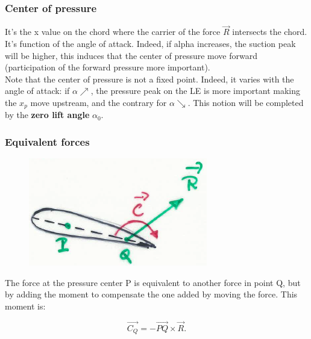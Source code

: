 				\subsubsection{Center of pressure}
					It's the x value on the chord where the carrier of the force $\vec{R}$ intersects the chord. It's function of the angle of attack. Indeed, if alpha increases, the suction peak will be higher, this induces that the center of pressure move forward (participation of the forward pressure more important).\\
					
					Note that the center of pressure is not a fixed point. Indeed, it varies with the angle of attack: if $\alpha \nearrow$, the pressure peak on the LE is more important making the $x_p$ move upstream, and the contrary for $\alpha \searrow$. This notion will be completed by the \textbf{zero lift angle} $\alpha _{0}$.
					
				\subsubsection{Equivalent forces}
					\begin{figure}
					\vspace{-5mm}
					\includegraphics[scale=0.4]{ch2/11}
					\end{figure}
					The force at the pressure center P is equivalent to another force in point Q, but by adding the moment to compensate the one added by moving the force. This moment is:
					
					\begin{equation}
					\vec{C_Q} = -\vec{PQ}\times \vec{R}.
					\end{equation}
					
